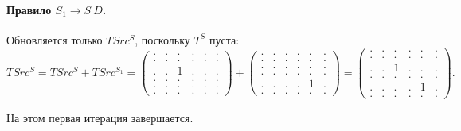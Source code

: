 \paragraph{Правило $S_1 \to S\ D$.}
Обновляется только $TSrc^S$, поскольку $T^S$ пуста:
{
    \renewcommand{\arraystretch}{0.7}
    \setlength\arraycolsep{2pt}
\[
    TSrc^S = TSrc^S + TSrc^{S_1} =
    \begin{pmatrix}
    . & . & . & . & . & . \\
    . & . & . & . & . & . \\
    . & . & 1 & . & . & . \\
    . & . & . & . & . & . \\
    . & . & . & . & . & . \\
    . & . & . & . & . & .
    \end{pmatrix} +
    \begin{pmatrix}
    . & . & . & . & . & . \\
    . & . & . & . & . & . \\
    . & . & . & . & . & . \\
    . & . & . & . & . & . \\
    . & . & . & . & 1 & . \\
    . & . & . & . & . & .
    \end{pmatrix} =
    \begin{pmatrix}
    . & . & . & . & . & . \\
    . & . & . & . & . & . \\
    . & . & 1 & . & . & . \\
    . & . & . & . & . & . \\
    . & . & . & . & 1 & . \\
    . & . & . & . & . & .
    \end{pmatrix}.
\]
}

На этом первая итерация завершается.

